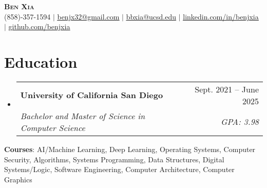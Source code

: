 \documentclass[letterpaper, 10pt]{article}
\makeatletter
\newcommand{\resumeSubheading}[4]{
  \vspace{4pt}\item
    \begin{tabular*}{0.97\textwidth}[t]{l@{\extracolsep{\fill}}r}
      \textbf{#1} & #2 \\
      \textit{#3} & \textit{\small #4} \\
    \end{tabular*}\vspace{-7pt}
}
\newcommand{\resumeSubHeadingListStart}{\begin{itemize}[leftmargin=0.15in, label={}]}
\newcommand{\resumeSubHeadingListEnd}{\end{itemize}}
\makeatother
\begin{document}

\begin{center}
  \textbf{\Huge \scshape Ben Xia} \uline{} \\ \vspace{1pt}
  \small (858)-357-1594 $|$
  \href{mailto:benjx32@gmail.com}{\uline{benjx32@gmail.com}} $|$
  \href{mailto:bbxia@ucsd.edu}{\uline{bbxia@ucsd.edu}} $|$
  \href{https://linkedin.com/in/benjxia}{\uline{linkedin.com/in/benjxia}} $|$
  \href{https://github.com/benjxia}{\uline{github.com/benjxia}}
\end{center}



\section{Education}
  \resumeSubHeadingListStart
  \resumeSubheading
      {University of California San Diego}{Sept. 2021 -- June 2025}
      {Bachelor and Master of Science in Computer Science}{GPA: 3.98}
  \resumeSubHeadingListEnd
  \begin{itemize}[leftmargin=0.15in, label={}]
    \small{\item{
     \textbf{Courses}{: AI/Machine Learning, Deep Learning, Operating Systems, Computer Security, Algorithms, Systems Programming, Data Structures, Digital Systems/Logic, Software Engineering, Computer Architecture, Computer Graphics } \\
    }}
 \end{itemize}
\end{document}
